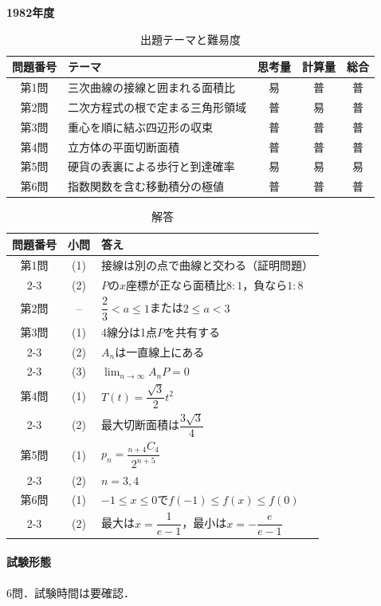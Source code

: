 \documentclass[../../main.tex]{subfiles}
\begin{document}
\begin{center}
  {\fontsize{48pt}{58pt}\selectfont \textbf{1982}\normalsize\textbf{年度}}
\end{center}

\begin{table}[htb]
  \centering
  \caption{出題テーマと難易度}
  \begin{tabular}{|c|p{6.2cm}|c|c|c|}
    \hline
    \textbf{問題番号} & \textbf{テーマ} & \textbf{思考量} & \textbf{計算量} & \textbf{総合} \\
    \hline
    第1問 & 三次曲線の接線と囲まれる面積比 & 易 & 普 & 普 \\
    \hline
    第2問 & 二次方程式の根で定まる三角形領域 & 普 & 易 & 普 \\
    \hline
    第3問 & 重心を順に結ぶ四辺形の収束 & 普 & 普 & 普 \\
    \hline
    第4問 & 立方体の平面切断面積 & 普 & 普 & 普 \\
    \hline
    第5問 & 硬貨の表裏による歩行と到達確率 & 易 & 易 & 易 \\
    \hline
    第6問 & 指数関数を含む移動積分の極値 & 普 & 普 & 普 \\
    \hline
  \end{tabular}
\end{table}

\begin{table}[htb]
  \centering
  \caption{解答}
  \renewcommand{\arraystretch}{1.4}
  \begin{tabular}{|c|c|p{9cm}|}
    \hline
    \textbf{問題番号} & \textbf{小問} & \textbf{答え} \\
    \hline
    第1問 & (1) & 接線は別の点で曲線と交わる（証明問題） \\
    \cline{2-3}
    & (2) & $P$の$x$座標が正なら面積比$8:1$，負なら$1:8$ \\
    \hline
    第2問 & -- & $\dfrac{2}{3}<a\le1$または$2\le a<3$ \\
    \hline
    第3問 & (1) & 4線分は1点$P$を共有する \\
    \cline{2-3}
    & (2) & $A_n$は一直線上にある \\
    \cline{2-3}
    & (3) & $\displaystyle\lim_{n\to\infty}A_nP=0$ \\
    \hline
    第4問 & (1) & $T(t)=\dfrac{\sqrt{3}}{2}t^2$ \\
    \cline{2-3}
    & (2) & 最大切断面積は$\dfrac{3\sqrt{3}}{4}$ \\
    \hline
    第5問 & (1) & $p_n=\dfrac{{}_{n+4}C_4}{2^{n+5}}$ \\
    \cline{2-3}
    & (2) & $n=3,4$ \\
    \hline
    第6問 & (1) & $-1\le x\le0$で$f(-1)\le f(x)\le f(0)$ \\
    \cline{2-3}
    & (2) & 最大は$x=\dfrac{1}{e-1}$，最小は$x=-\dfrac{e}{e-1}$ \\
    \hline
  \end{tabular}
\end{table}

\paragraph{試験形態}
6問．試験時間は要確認．
\end{document}
